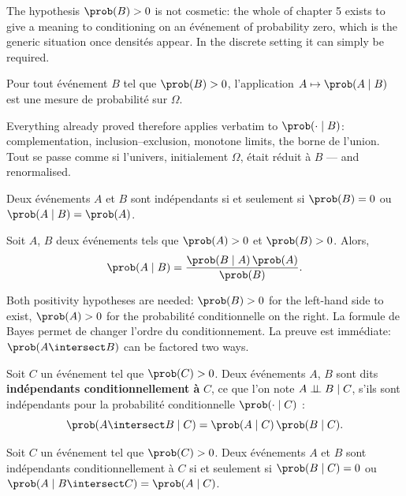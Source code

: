 The hypothesis $\prob(B) > 0$ is not cosmetic: the whole of chapter 5 exists to
give a meaning to conditioning on an événement of probability zero, which is the
generic situation once densités appear. In the discrete setting it can simply be
required.

\begin{prop}
  Pour tout événement $B$ tel que $\prob(B) > 0$, l'application
  $A \mapsto \prob(A \mid B)$ est une mesure de probabilité sur $\Omega$.
\end{prop}

Everything already proved therefore applies verbatim to $\prob(\cdot \mid B)$:
complementation, inclusion--exclusion, monotone limits, the borne de l'union.
Tout se passe comme si l'univers, initialement $\Omega$, était réduit à $B$ ---
and renormalised.

\begin{prop}
  Deux événements $A$ et $B$ sont indépendants si et seulement si
  $\prob(B) = 0$ ou $\prob(A \mid B) = \prob(A)$.
\end{prop}

\begin{prop}
  Soit $A$, $B$ deux événements tels que $\prob(A) > 0$ et $\prob(B) > 0$. Alors,
  \[ \prob(A \mid B) = \frac{\prob(B \mid A)\,\prob(A)}{\prob(B)}. \]
\end{prop}

Both positivity hypotheses are needed: $\prob(B) > 0$ for the left-hand side to
exist, $\prob(A) > 0$ for the probabilité conditionnelle on the right. La
formule de Bayes permet de changer l'ordre du conditionnement. La preuve est
immédiate: $\prob(A \intersect B)$ can be factored two ways.

\begin{definition}
  Soit $C$ un événement tel que $\prob(C) > 0$. Deux événements $A$, $B$ sont
  dits \textbf{indépendants conditionnellement à} $C$, ce que l'on note
  $A \perp\!\!\!\perp B \mid C$, s'ils sont indépendants pour la probabilité
  conditionnelle $\prob(\cdot \mid C)$ :
  \[ \prob(A \intersect B \mid C) = \prob(A \mid C)\,\prob(B \mid C). \]
\end{definition}

\begin{prop}
  Soit $C$ un événement tel que $\prob(C) > 0$. Deux événements $A$ et $B$ sont
  indépendants conditionnellement à $C$ si et seulement si $\prob(B \mid C) = 0$
  ou $\prob(A \mid B \intersect C) = \prob(A \mid C)$.
\end{prop}

